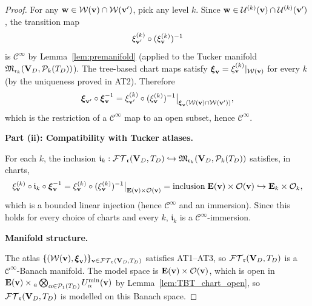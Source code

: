 \begin{proof}
For any $\mathbf{w} \in \mathcal{W}(\mathbf{v}) \cap \mathcal{W}(\mathbf{v}')$,
pick any level $k$. Since $\mathbf{w} \in \mathcal{U}^{(k)}(\mathbf{v}) \cap
\mathcal{U}^{(k)}(\mathbf{v}')$, the transition map
\begin{equation*}
    \xi_{\mathbf{v}'}^{(k)} \circ (\xi_{\mathbf{v}}^{(k)})^{-1}
\end{equation*}
is $\mathcal{C}^\infty$ by Lemma~\ref{lem:premanifold}
(applied to the Tucker manifold $\mathfrak{M}_{\mathfrak{r}_k}(\mathbf{V}_D, \mathcal{P}_{k}(T_D))$).
The tree-based chart maps satisfy
$\boldsymbol{\xi}_{\mathbf{v}} = \xi_{\mathbf{v}}^{(k)}|_{\mathcal{W}(\mathbf{v})}$
for every $k$ (by the uniqueness proved in AT2). Therefore
\begin{equation*}
    \boldsymbol{\xi}_{\mathbf{v}'} \circ \boldsymbol{\xi}_{\mathbf{v}}^{-1}
    = \xi_{\mathbf{v}'}^{(k)} \circ (\xi_{\mathbf{v}}^{(k)})^{-1}
    \big|_{\boldsymbol{\xi}_{\mathbf{v}}(\mathcal{W}(\mathbf{v}) \cap \mathcal{W}(\mathbf{v}'))},
\end{equation*}
which is the restriction of a $\mathcal{C}^\infty$ map to an open
subset, hence $\mathcal{C}^\infty$.

\medskip
\noindent\textbf{Part (ii): Compatibility with Tucker atlases.}

For each $k$, the inclusion $\mathfrak{i}_k: \mathcal{FT}_{\mathfrak{r}}(\mathbf{V}_D,T_D) \hookrightarrow
\mathfrak{M}_{\mathfrak{r}_k}(\mathbf{V}_D, \mathcal{P}_{k}(T_D))$ satisfies, in charts,
\begin{equation*}
    \xi_{\mathbf{v}}^{(k)} \circ \mathfrak{i}_k
    \circ \boldsymbol{\xi}_{\mathbf{v}}^{-1}
    = \xi_{\mathbf{v}}^{(k)} \circ (\xi_{\mathbf{v}}^{(k)})^{-1}
    \big|_{\mathbf{E}(\mathbf{v}) \times \mathcal{O}(\mathbf{v})}
    = \text{inclusion}\;
    \mathbf{E}(\mathbf{v}) \times \mathcal{O}(\mathbf{v})
    \hookrightarrow \mathbf{E}_{k} \times \mathcal{O}_k,
\end{equation*}
which is a bounded linear injection (hence $\mathcal{C}^\infty$ and an
immersion). Since this holds for every choice of charts and every $k$,
$\mathfrak{i}_k$ is a $\mathcal{C}^\infty$-immersion.

\medskip
\noindent\textbf{Manifold structure.}

The atlas $\{(\mathcal{W}(\mathbf{v}), \boldsymbol{\xi}_{\mathbf{v}})\}_{\mathbf{v} \in \mathcal{FT}_{\mathfrak{r}}(\mathbf{V}_D,T_D)}$
satisfies AT1--AT3, so $\mathcal{FT}_{\mathfrak{r}}(\mathbf{V}_D,T_D)$ is a $\mathcal{C}^\infty$-Banach manifold.
The model space is $\mathbf{E}(\mathbf{v}) \times \mathcal{O}(\mathbf{v})$, which is
open in $\mathbf{E}(\mathbf{v}) \times {}_a\bigotimes_{\alpha \in \mathcal{P}_{1}(T_D)}
U^{\min}_{\alpha}(\mathbf{v})$ by Lemma~\ref{lem:TBT_chart_open}, so $\mathcal{FT}_{\mathfrak{r}}(\mathbf{V}_D,T_D)$ is
modelled on this Banach space.
\end{proof}

